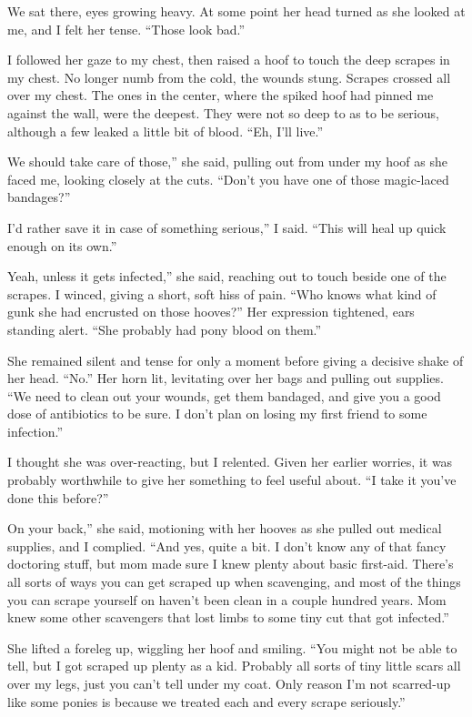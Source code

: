 We sat there, eyes growing heavy. At some point her head turned as she looked at me, and I felt her tense. “Those look bad.”

I followed her gaze to my chest, then raised a hoof to touch the deep scrapes in my chest. No longer numb from the cold, the wounds stung. Scrapes crossed all over my chest. The ones in the center, where the spiked hoof had pinned me against the wall, were the deepest. They were not so deep to as to be serious, although a few leaked a little bit of blood. “Eh, I’ll live.”

\leavevmode{}We should take care of those,” she said, pulling out from under my hoof as she faced me, looking closely at the cuts. “Don’t you have one of those magic-laced bandages?”

\leavevmode{}I’d rather save it in case of something serious,” I said. “This will heal up quick enough on its own.”

\leavevmode{}Yeah, unless it gets infected,” she said, reaching out to touch beside one of the scrapes. I winced, giving a short, soft hiss of pain. “Who knows what kind of gunk she had encrusted on those hooves?” Her expression tightened, ears standing alert. “She probably had pony blood on them.”

She remained silent and tense for only a moment before giving a decisive shake of her head. “No.” Her horn lit, levitating over her bags and pulling out supplies. “We need to clean out your wounds, get them bandaged, and give you a good dose of antibiotics to be sure. I don’t plan on losing my first friend to some infection.”

I thought she was over-reacting, but I relented. Given her earlier worries, it was probably worthwhile to give her something to feel useful about. “I take it you’ve done this before?”

\leavevmode{}On your back,” she said, motioning with her hooves as she pulled out medical supplies, and I complied. “And yes, quite a bit. I don’t know any of that fancy doctoring stuff, but mom made sure I knew plenty about basic first-aid. There’s all sorts of ways you can get scraped up when scavenging, and most of the things you can scrape yourself on haven’t been clean in a couple hundred years. Mom knew some other scavengers that lost limbs to some tiny cut that got infected.”

She lifted a foreleg up, wiggling her hoof and smiling. “You might not be able to tell, but I got scraped up plenty as a kid. Probably all sorts of tiny little scars all over my legs, just you can’t tell under my coat. Only reason I’m not scarred-up like some ponies is because we treated each and every scrape seriously.”

